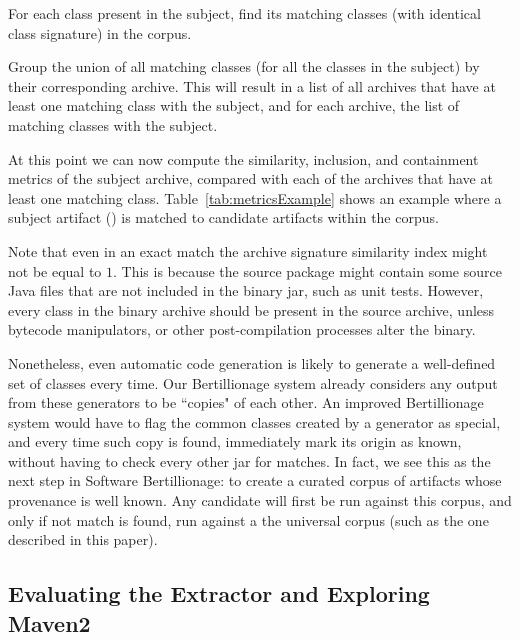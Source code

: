 \begin{compactenum}

\item For each class present in the subject, find its matching classes
    (with identical class signature) in the corpus.

\item Group the union of all matching classes (for all the classes in the
    subject) by their corresponding archive. This will result in a list of
    all archives that have at least one matching class with the subject,
    and for each archive, the list of matching classes with the subject.

\end{compactenum}

At this point we can now compute the similarity, inclusion, and containment
metrics of
the subject archive, compared with each of the archives that have at least one
matching class.  Table~\ref{tab:metricsExample} shows an example where a
subject artifact () is matched to candidate artifacts
within the corpus.

Note that even in an exact match the archive signature similarity index
might not be equal to $1$. This is because the source package might contain
some source Java files that are not included in the binary jar, such as
unit tests.  However, every class in the binary archive should be present
in the source archive, unless bytecode manipulators, or other post-compilation
processes alter the binary.

Nonetheless, even automatic code generation is likely to generate a well-defined set of
classes every time.
Our Bertillionage system already considers any output from these generators
to be ``copies" of each other. An improved Bertillionage system would
have to flag the common classes created by a generator as special, and
every time such copy is found, immediately mark its origin as known,
without having to check every other jar for matches. In fact, we see
this as the next step in Software Bertillionage: to create a curated
corpus of artifacts whose provenance is well known. Any candidate will
first be run against this corpus, and only if not match is found, run
against a the universal corpus (such as the one described in this
paper).


\subsection{Evaluating the Extractor and Exploring Maven2}
\label{sec:mavenExplore}

